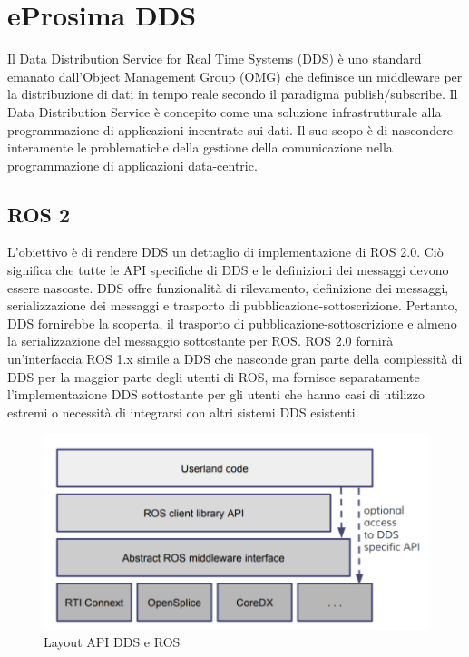 \documentclass[a4paper]{article}
\begin{document}
\newpage
\section{eProsima DDS}

Il Data Distribution Service for Real Time Systems (DDS) è uno standard emanato dall'Object Management Group (OMG) che definisce un middleware per la distribuzione di dati in tempo reale secondo il paradigma publish/subscribe.
Il Data Distribution Service è concepito come una soluzione infrastrutturale alla programmazione di applicazioni incentrate sui dati. Il suo scopo è di nascondere interamente le problematiche della gestione della comunicazione nella programmazione di applicazioni data-centric.

\subsection{ROS 2}
L'obiettivo è di rendere DDS un dettaglio di implementazione di ROS 2.0. Ciò significa che tutte le API specifiche di DDS e le definizioni dei messaggi devono essere nascoste. DDS offre funzionalità di rilevamento, definizione dei messaggi, serializzazione dei messaggi e trasporto di pubblicazione-sottoscrizione. Pertanto, DDS fornirebbe la scoperta, il trasporto di pubblicazione-sottoscrizione e almeno la serializzazione del messaggio sottostante per ROS. ROS 2.0 fornirà un'interfaccia ROS 1.x simile a DDS che nasconde gran parte della complessità di DDS per la maggior parte degli utenti di ROS, ma fornisce  separatamente l'implementazione DDS sottostante per gli utenti che hanno casi di utilizzo estremi o necessità di integrarsi con altri sistemi DDS esistenti.

\begin{figure}[htbp]
\centering
\includegraphics[scale=0.5]{dds_img.PNG} 
\caption{Layout API DDS e ROS}
\end{figure}
\end{document}
